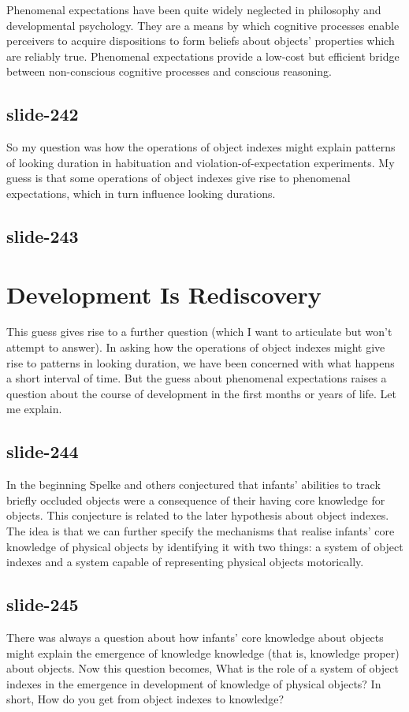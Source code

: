 \documentclass[12pt,\papersize]{extarticle}
\begin{document}
Phenomenal expectations have been quite widely neglected in philosophy and
developmental psychology.
They are a means by which cognitive processes enable perceivers to
acquire dispositions to form beliefs about objects’ properties which are
reliably true.
Phenomenal expectations provide a low-cost but efficient bridge between
non-conscious cognitive processes and conscious reasoning.

\subsection{slide-242}
So my question was how the operations of object indexes might
explain patterns of looking duration in habituation and
violation-of-expectation experiments.
My guess is that some operations of object indexes give rise to
phenomenal expectations, which in turn influence looking durations.

\subsection{slide-243}
\section{Development Is Rediscovery}

This guess gives rise to a further question (which I want to articulate
but won’t attempt to answer).
In asking how the operations of object indexes might give rise to
patterns in looking duration, we have been concerned with what happens a
short interval of time.
But the guess about phenomenal expectations raises a question
about the course of development in the first months or years of life.
Let me explain.

\subsection{slide-244}
In the beginning Spelke and others conjectured that infants’
abilities to track briefly occluded objects were a consequence of their
having core knowledge for objects.
This conjecture is related to the later hypothesis about object indexes.
The idea is that we can further specify the mechanisms that realise
infants’ core knowledge of physical objects by identifying it with
two things: a system of object indexes and a system capable of representing
physical objects motorically.

\subsection{slide-245}
There was always a question about how infants’ core knowledge about
objects might explain the emergence of knowledge knowledge
(that is, knowledge proper) about objects.
Now this question becomes, What is the role of a system of object
indexes in the emergence in development of knowledge of physical
objects?
In short, How do you get from object indexes to knowledge?
\end{document}
